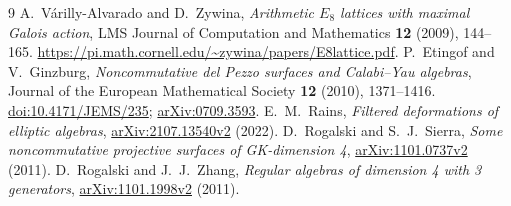 \documentclass[11pt,a4paper]{ltjsarticle}
\begin{document}
\begingroup
\small
\begin{thebibliography}{9}
A.~V\'arilly-Alvarado and D.~Zywina,
\emph{Arithmetic $E_8$ lattices with maximal Galois action},
LMS Journal of Computation and Mathematics \textbf{12} (2009), 144--165.
\url{https://pi.math.cornell.edu/~zywina/papers/E8lattice.pdf}.
P.~Etingof and V.~Ginzburg,
\emph{Noncommutative del Pezzo surfaces and Calabi--Yau algebras},
Journal of the European Mathematical Society \textbf{12} (2010), 1371--1416.
\href{https://doi.org/10.4171/JEMS/235}{doi:10.4171/JEMS/235};
\href{https://arxiv.org/abs/0709.3593}{arXiv:0709.3593}.
E.~M.~Rains, \emph{Filtered deformations of elliptic algebras},
\href{https://arxiv.org/abs/2107.13540v2}{arXiv:2107.13540v2} (2022).
D.~Rogalski and S.~J.~Sierra,
\emph{Some noncommutative projective surfaces of GK-dimension 4},
\href{https://arxiv.org/abs/1101.0737v2}{arXiv:1101.0737v2} (2011).
D.~Rogalski and J.~J.~Zhang,
\emph{Regular algebras of dimension 4 with 3 generators},
\href{https://arxiv.org/abs/1101.1998v2}{arXiv:1101.1998v2} (2011).
\end{thebibliography}
\endgroup
\end{document}
